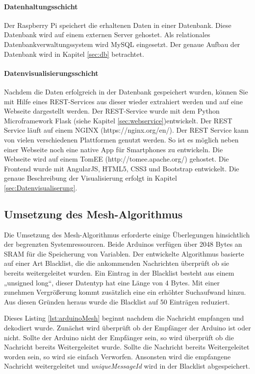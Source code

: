 \paragraph{Datenhaltungsschicht} Der Raspberry Pi speichert die erhaltenen Daten in einer Datenbank. Diese Datenbank wird auf einem externen Server gehostet. Als relationales Datenbankverwaltungssystem wird MySQL eingesetzt. Der genaue Aufbau der Datenbank wird in Kapitel \ref{sec:db} betrachtet.
\paragraph{Datenvisualisierungsschicht} Nachdem die Daten erfolgreich in der Datenbank gespeichert wurden, können Sie mit Hilfe eines REST-Services aus dieser wieder extrahiert werden und auf eine Webseite dargestellt werden. Der REST-Service wurde mit dem Python Microframework Flask (siehe Kapitel \ref{sec:webservice})entwickelt. Der REST Service läuft auf einem NGINX (https://nginx.org/en/). Der REST Service kann von vielen verschiedenen Plattformen genutzt werden. So ist es möglich neben einer Webseite noch eine native App für Smartphones zu entwickeln. Die Webseite wird auf einem TomEE (http://tomee.apache.org/) gehostet. Die Frontend wurde mit AngularJS, HTML5, CSS3 und Bootstrap entwickelt. Die genaue Beschreibung der Visualisierung erfolgt in Kapitel \ref{sec:Datenvisualiserung}.
\subsection{Umsetzung des Mesh-Algorithmus}
\label{sec:MeshAlgorithmus}
Die Umsetzung des Mesh-Algorithmus erforderte einige Überlegungen hinsichtlich der begrenzten Systemressourcen. Beide Arduinos verfügen über 2048 Bytes an SRAM für die Speicherung von Variablen. Der entwickelte Algorithmus basierte auf einer Art Blacklist, die die ankommenden Nachrichten überprüft ob sie bereits weitergeleitet wurden. Ein Eintrag in der Blacklist besteht aus einem „unsigned long“, dieser Datentyp hat eine Länge von 4 Bytes. Mit einer zunehmen Vergrößerung kommt zusätzlich eine ein erhöhter Suchaufwand hinzu. Aus diesen Gründen heraus wurde die Blacklist auf 50 Einträgen reduziert.


Dieses Listing \ref{lst:arduinoMesh} beginnt nachdem die Nachricht empfangen und dekodiert wurde. Zunächst wird überprüft ob der Empfänger der Arduino ist oder nicht. Sollte der Arduino nicht der Empfänger sein, so wird überprüft ob die Nachricht bereits Weitergeleitet wurde. Sollte die Nachricht bereits Weitergeleitet worden sein, so wird sie einfach Verworfen. Ansonsten wird die empfangene Nachricht weitergeleitet und \textit{uniqueMessageId} wird in der Blacklist abgespeichert. 
